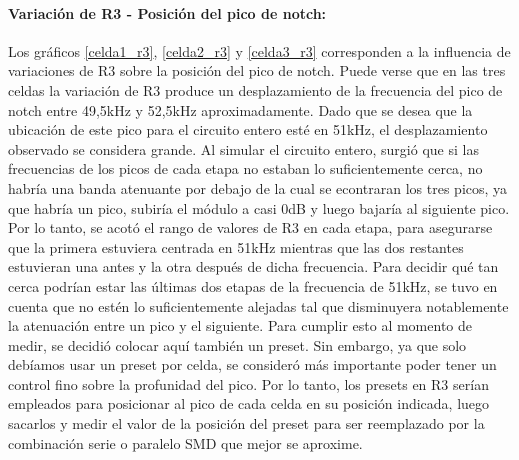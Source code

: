 \paragraph{Variaci\'on de R3 - Posici\'on del pico de notch:} Los gr\'aficos \ref{celda1_r3}, \ref{celda2_r3} y \ref{celda3_r3} corresponden a la influencia de variaciones de R3 sobre la posici\'on del pico de notch. Puede verse que en las tres celdas la variaci\'on de R3 produce un desplazamiento de la frecuencia del pico de notch entre 49,5kHz y 52,5kHz aproximadamente. Dado que se desea que la ubicaci\'on de este pico para el circuito entero est\'e en 51kHz, el desplazamiento observado se considera grande. Al simular el circuito entero, surgi\'o que si las frecuencias de los picos de cada etapa no estaban lo suficientemente cerca, no habr\'ia una banda atenuante por debajo de la cual se econtraran los tres picos, ya que habr\'ia un pico, subir\'ia el m\'odulo a casi 0dB y luego bajar\'ia al siguiente pico. Por lo tanto, se acot\'o el rango de valores de R3 en cada etapa, para asegurarse que la primera estuviera centrada en 51kHz mientras que las dos restantes estuvieran una antes y la otra despu\'es de dicha frecuencia. Para decidir qu\'e tan cerca podr\'ian estar las \'ultimas dos etapas de la frecuencia de 51kHz, se tuvo en cuenta que no est\'en lo suficientemente alejadas tal que disminuyera notablemente la atenuaci\'on entre un pico y el siguiente. Para cumplir esto al momento de medir, se decidi\'o colocar aqu\'i tambi\'en un preset. Sin embargo, ya que solo deb\'iamos usar un preset por celda, se consider\'o m\'as importante poder tener un control fino sobre la profunidad del pico. Por lo tanto, los presets en R3 ser\'ian empleados para posicionar al pico de cada celda en su posici\'on indicada, luego sacarlos y medir el valor de la posici\'on del preset para ser reemplazado por la combinaci\'on serie o paralelo SMD que mejor se aproxime.

